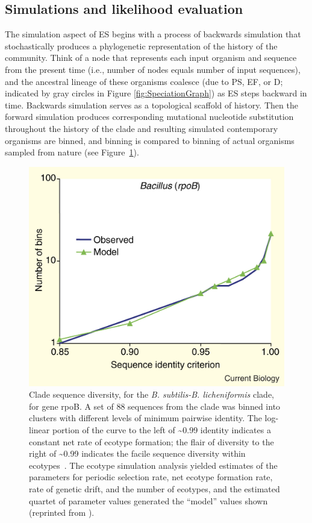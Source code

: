 \subsection*{Simulations and likelihood evaluation}
The simulation aspect of ES begins with a process of backwards simulation that stochastically produces a phylogenetic representation of the history of the community.
Think of a node that represents each input organism and sequence from the present time (i.e., number of nodes equals number of input sequences), and the ancestral lineage of these organisms coalesce (due to PS, EF, or D; indicated by gray circles in Figure \ref{fig:SpeciationGraph}) as ES steps backward in time.
Backwards simulation serves as a topological scaffold of history.
Then the forward simulation produces corresponding mutational nucleotide substitution throughout the history of the clade and resulting simulated contemporary organisms are binned, and binning is compared to binning of actual organisms sampled from nature (see Figure~\ref{fig:TreeCompare}).

\begin{figure}[h!]
\centering
\includegraphics[scale=1.5]{images/TreeCompare-CH2}
\caption[Observed and simulated evolutionary histories.]{Clade sequence diversity, for the \emph{B. subtilis-B. licheniformis} clade, for gene rpoB. A set of 88 sequences from the clade was binned into clusters with different levels of minimum pairwise identity. The log-linear portion of the curve to the left of \textasciitilde0.99 identity indicates a constant net rate of ecotype formation; the flair of diversity to the right of \textasciitilde0.99 indicates the facile sequence diversity within ecotypes~\cite{acinas2004fine}. The ecotype simulation analysis yielded estimates of the parameters for periodic selection rate, net ecotype formation rate, rate of genetic drift, and the number of ecotypes, and the estimated quartet of parameter values generated the ``model'' values shown~\cite{koeppel2008identifying} (reprinted from \protect\cite{cohan2007systematics}).}
\label{fig:TreeCompare}
\end{figure}

